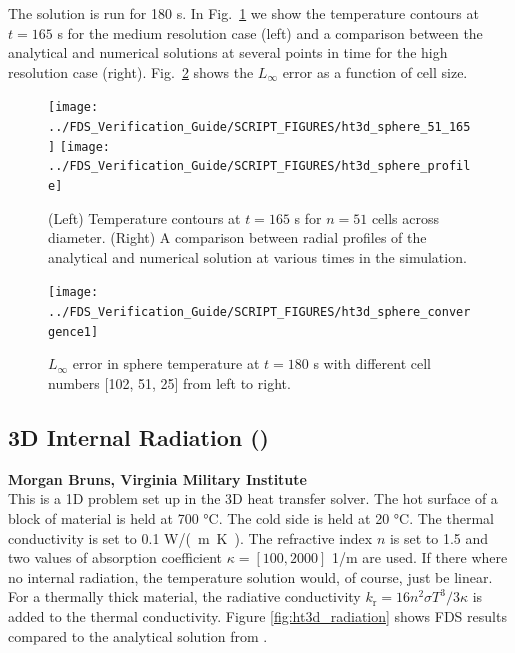 \documentclass[11pt]{book}
\begin{document}
The solution is run for 180 s. In Fig.~\ref{fig:ht3d_sphere_time} we show the temperature contours at $t=165$ s for the medium resolution case (left) and a comparison between the analytical and numerical solutions at several points in time for the high resolution case (right). Fig.~\ref{fig:ht3d_sphere_conv} shows the $L_\infty$ error as a function of cell size.

\begin{figure}[ht]
\centering
\texttt{[image: ../FDS\_Verification\_Guide/SCRIPT\_FIGURES/ht3d\_sphere\_51\_165]}
\texttt{[image: ../FDS\_Verification\_Guide/SCRIPT\_FIGURES/ht3d\_sphere\_profile]}
\caption[The  profiles]{(Left) Temperature contours at $t = 165$ s for $n=51$ cells across diameter. (Right) A comparison between radial profiles of the analytical and numerical solution at various times in the simulation.}
\label{fig:ht3d_sphere_time}
\end{figure}

\begin{figure}[ht]
\centering
\texttt{[image: ../FDS\_Verification\_Guide/SCRIPT\_FIGURES/ht3d\_sphere\_convergence1]}
\caption[The  convergence]{$L_{\infty}$ error in sphere temperature at $t=180$ s with different cell numbers [102, 51, 25] from left to right.}
\label{fig:ht3d_sphere_conv}
\end{figure}

\subsection{3D Internal Radiation (\texorpdfstring{}{ht3d\_radiation})}
\label{ht3d_radiation}

\textbf{Morgan Bruns, Virginia Military Institute}\\

This is a 1D problem set up in the 3D heat transfer solver.  The hot surface of a block of material is held at 700 \si{\degreeCelsius}.  The cold side is held at 20 \si{\degreeCelsius}.  The thermal conductivity is set to 0.1 \si{W/(m.K)}.  The refractive index $n$ is set to 1.5 and two values of absorption coefficient $\kappa = [100, 2000]$ 1/m are used.  If there where no internal radiation, the temperature solution would, of course, just be linear.  For a thermally thick material, the radiative conductivity $k_{\mathrm{r}} = 16 n^2 \sigma T^3 / 3 \kappa$ is added to the thermal conductivity.  Figure \ref{fig:ht3d_radiation} shows FDS results compared to the analytical solution from \cite{Modest:2003}.
\end{document}
